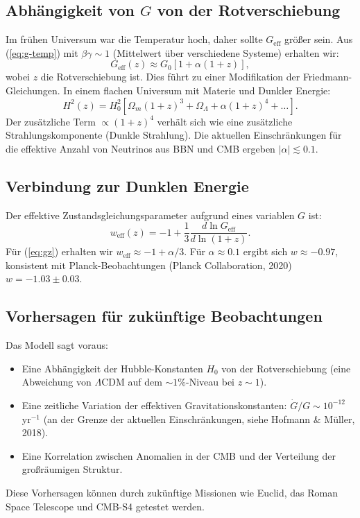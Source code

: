 \documentclass[12pt]{article}
\theoremstyle{remark}
\begin{document}
	\subsection{Abhängigkeit von $G$ von der Rotverschiebung}
	\label{subsec:cosmo-gz}
	
	Im frühen Universum war die Temperatur hoch, daher sollte $G_{\text{eff}}$ größer sein. Aus (\ref{eq:g-temp}) mit $\beta\gamma \sim 1$ (Mittelwert über verschiedene Systeme) erhalten wir:
	\begin{equation}
		G_{\text{eff}}(z) \approx G_0 \left[ 1 + \alpha (1+z) \right],
		\label{eq:gz}
	\end{equation}
	wobei $z$ die Rotverschiebung ist. Dies führt zu einer Modifikation der Friedmann-Gleichungen. In einem flachen Universum mit Materie und Dunkler Energie:
	\begin{equation}
		H^2(z) = H_0^2 \left[ \Omega_m (1+z)^3 + \Omega_\Lambda + \alpha (1+z)^4 + \dots \right].
		\label{eq:friedmann}
	\end{equation}
	Der zusätzliche Term $\propto (1+z)^4$ verhält sich wie eine zusätzliche Strahlungskomponente (Dunkle Strahlung). Die aktuellen Einschränkungen für die effektive Anzahl von Neutrinos aus BBN und CMB ergeben $|\alpha| \lesssim 0.1$.
	
	\subsection{Verbindung zur Dunklen Energie}
	\label{subsec:cosmo-de}
	
	Der effektive Zustandsgleichungsparameter aufgrund eines variablen $G$ ist:
	\begin{equation}
		w_{\text{eff}}(z) = -1 + \frac{1}{3} \frac{d \ln G_{\text{eff}}}{d \ln(1+z)}.
		\label{eq:weff}
	\end{equation}
	Für (\ref{eq:gz}) erhalten wir $w_{\text{eff}} \approx -1 + \alpha/3$. Für $\alpha \approx 0.1$ ergibt sich $w \approx -0.97$, konsistent mit Planck-Beobachtungen (Planck Collaboration, 2020) $w = -1.03 \pm 0.03$.
	
	\subsection{Vorhersagen für zukünftige Beobachtungen}
	\label{subsec:cosmo-predictions}
	
	Das Modell sagt voraus:
	\begin{itemize}
		\item Eine Abhängigkeit der Hubble-Konstanten $H_0$ von der Rotverschiebung (eine Abweichung von $\Lambda$CDM auf dem $\sim 1\%$-Niveau bei $z\sim 1$).
		\item Eine zeitliche Variation der effektiven Gravitationskonstanten: $\dot{G}/G \sim 10^{-12}$ yr$^{-1}$ (an der Grenze der aktuellen Einschränkungen, siehe Hofmann \& Müller, 2018).
		\item Eine Korrelation zwischen Anomalien in der CMB und der Verteilung der großräumigen Struktur.
	\end{itemize}
	Diese Vorhersagen können durch zukünftige Missionen wie Euclid, das Roman Space Telescope und CMB-S4 getestet werden.
	
\end{document}
